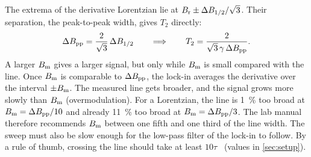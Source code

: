 The extrema of the derivative Lorentzian lie at $B_\mathrm{r}\pm\Delta B_{1/2}/\sqrt3$. Their separation, the peak-to-peak width,
gives $T_2$ directly:
\begin{equation}\label{eq:t2}
  \Delta B_\mathrm{pp}=\frac{2}{\sqrt3}\,\Delta B_{1/2}
  \qquad\Longrightarrow\qquad
  T_2=\frac{2}{\sqrt3\,\gamma\,\Delta B_\mathrm{pp}}.
\end{equation}
A larger $B_\mathrm{m}$ gives a larger signal, but only while $B_\mathrm{m}$ is small compared with the line. Once $B_\mathrm{m}$ is comparable to
$\Delta B_\mathrm{pp}$, the lock-in averages the derivative over the interval $\pm B_\mathrm{m}$. The measured line gets broader, and the signal
grows more slowly than $B_\mathrm{m}$ (overmodulation). For a Lorentzian, the line is \qty{1}{\percent} too broad at
$B_\mathrm{m}=\Delta B_\mathrm{pp}/10$ and already \qty{11}{\percent} too broad at $B_\mathrm{m}=\Delta B_\mathrm{pp}/3$. The lab manual therefore recommends $B_\mathrm{m}$
between one fifth and one third of the line width. The sweep must also be slow enough for the low-pass filter of the lock-in
to follow. By a rule of thumb, crossing the line should take at least $10\tau$~\cite{shiroka} (values in \cref{sec:setup}).

